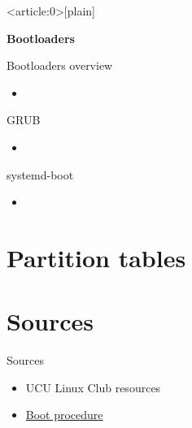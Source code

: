 \documentclass[usenames,dvipsnames,10pt,aspectratio=169]{beamer}
\begin{document}
{ %
    \begin{frame}<article:0>[plain]
        {\huge \textbf{Bootloaders}}
     \end{frame}
}

\begin{frame}{Bootloaders overview}
    \begin{itemize}
        \item 
    \end{itemize}
\end{frame}
    
\begin{frame}{GRUB}
    \begin{itemize}
        \item 
    \end{itemize}
\end{frame}

\begin{frame}{systemd-boot}
    \begin{itemize}
        \item 
    \end{itemize}
\end{frame}

\section{Partition tables}

\section{Sources}
\begin{frame}{Sources}
    \begin{itemize}
        \item UCU Linux Club resources
        \item \href{https://www.freecodecamp.org/news/uefi-vs-bios/}{Boot procedure}
    \end{itemize}
\end{frame}
\end{document}
